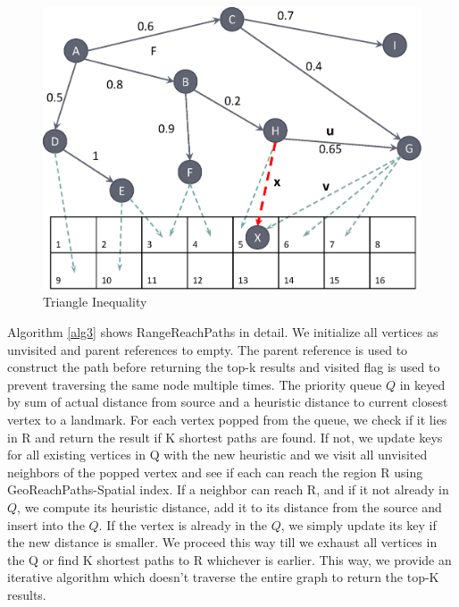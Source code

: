 {\begin{figure}[t]
    \centering
    \includegraphics[width=0.88\linewidth]{images/triangle_inequality.eps}
    \caption{Triangle Inequality}
    \label{fig:tri-ine}
\end{figure}

Algorithm \ref{alg3} shows RangeReachPaths in detail. We initialize all vertices as unvisited and parent references to empty. The parent reference is used to construct the path before returning the top-k results and visited flag is used to prevent traversing the same node multiple times. The priority queue $Q$ in keyed by sum of actual distance from source and a heuristic distance to current closest vertex to a landmark. For each vertex popped from the queue, we check if it lies in R and return the result if K shortest paths are found. If not, we update keys for all existing vertices in Q with the new heuristic and we visit all unvisited neighbors of the popped vertex and see if each can reach the region R using GeoReachPaths-Spatial index. If a neighbor can reach R, and if it not already in $Q$, we compute its heuristic distance, add it to its distance from the source and insert into the $Q$. If the vertex is already in the $Q$, we simply update its key if the new distance is smaller. We proceed this way till we exhaust all vertices in the Q or find K shortest paths to R whichever is earlier. This way, we provide an iterative algorithm which doesn't traverse the entire graph to return the top-K results.

		
}
